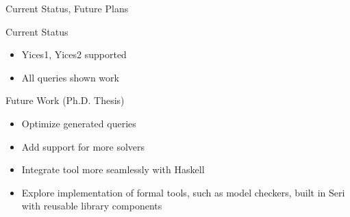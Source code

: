 \documentclass{beamer}
\begin{document}
\begin{frame}{Current Status, Future Plans}
\begin{block}{Current Status}
    \begin{itemize}
        \item Yices1, Yices2 supported
        \item All queries shown work
    \end{itemize}
\end{block}
\pause
\begin{block}{Future Work (Ph.D. Thesis)}
    \begin{itemize}
        \item Optimize generated queries
        \item Add support for more solvers
        \item Integrate tool more seamlessly with Haskell
        \item Explore implementation of formal tools, such as model checkers,
              built in Seri with reusable library components
    \end{itemize}
\end{block}
\end{frame}
\end{document}

